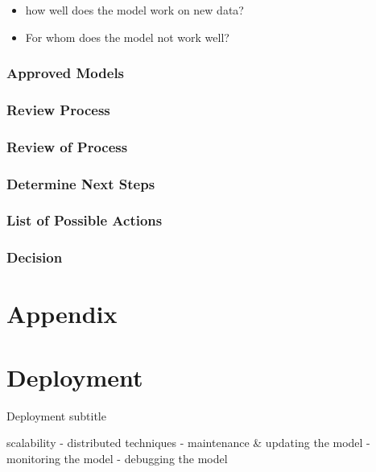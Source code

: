 \documentclass[
  american,
  10,
  a4paper,
]{book}
\theoremstyle{definition}
\theoremstyle{remark}
\begin{document}
\begin{itemize}
\item
  how well does the model work on new data?
\item
  For whom does the model not work well?
\end{itemize}

\subsection{Approved Models}\label{approved-models}

\subsection{Review Process}\label{review-process}

\subsection{Review of Process}\label{review-of-process}

\subsection{Determine Next Steps}\label{determine-next-steps}

\subsection{List of Possible Actions}\label{list-of-possible-actions}

\subsection{Decision}\label{decision}

\chapter*{Appendix}\label{appendix-2}


\chapter{Deployment}\label{deployment-1}

Deployment subtitle

\hfill\break

scalability - distributed techniques - maintenance \& updating the model
- monitoring the model - debugging the model
\end{document}
